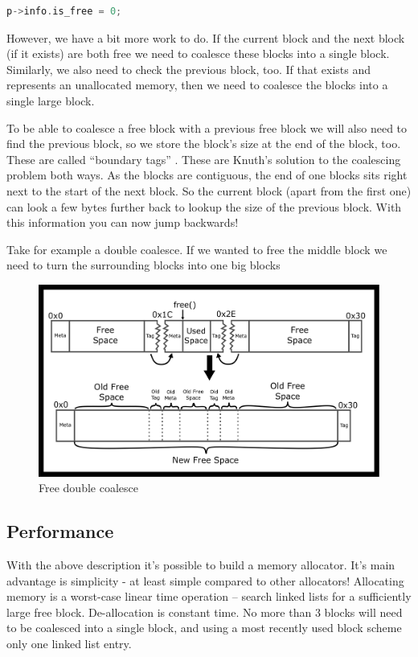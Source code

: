 \begin{lstlisting}[language=C]
p->info.is_free = 0;
\end{lstlisting}

However, we have a bit more work to do.
If the current block and the next block (if it exists) are both free we need to coalesce these blocks into a single block.
Similarly, we also need to check the previous block, too.
If that exists and represents an unallocated memory, then we need to coalesce the blocks into a single large block.

To be able to coalesce a free block with a previous free block we will also need to find the previous block, so we store the block's size at the end of the block, too.
These are called ``boundary tags'' \cite{knuth1973art}.
These are Knuth's solution to the coalescing problem both ways.
As the blocks are contiguous, the end of one blocks sits right next to the start of the next block.
So the current block (apart from the first one) can look a few bytes further back to lookup the size of the previous block.
With this information you can now jump backwards!

Take for example a double coalesce.
If we wanted to free the middle block we need to turn the surrounding blocks into one big blocks

\begin{figure}[H]
\centering
\includegraphics[width=.9\textwidth]{malloc/drawings/malloc_double_coalesce.png}
\caption{Free double coalesce}
\end{figure}

\subsection{Performance}

With the above description it's possible to build a memory allocator.
It's main advantage is simplicity - at least simple compared to other allocators!
Allocating memory is a worst-case linear time operation -- search linked lists for a sufficiently large free block.
De-allocation is constant time.
No more than 3 blocks will need to be coalesced into a single block, and using a most recently used block scheme only one linked list entry.

